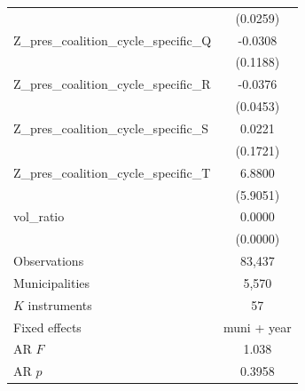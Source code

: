 \begin{tabular}{lc}
 & (0.0259) \\
Z\_pres\_coalition\_cycle\_specific\_Q & -0.0308 \\
 & (0.1188) \\
Z\_pres\_coalition\_cycle\_specific\_R & -0.0376 \\
 & (0.0453) \\
Z\_pres\_coalition\_cycle\_specific\_S & 0.0221 \\
 & (0.1721) \\
Z\_pres\_coalition\_cycle\_specific\_T & 6.8800 \\
 & (5.9051) \\
vol\_ratio & 0.0000 \\
 & (0.0000) \\
\midrule
Observations & 83,437 \\
Municipalities & 5,570 \\
$K$ instruments & 57 \\
Fixed effects & muni + year \\
AR $F$ & 1.038 \\
AR $p$ & 0.3958 \\
\bottomrule
\end{tabular}
